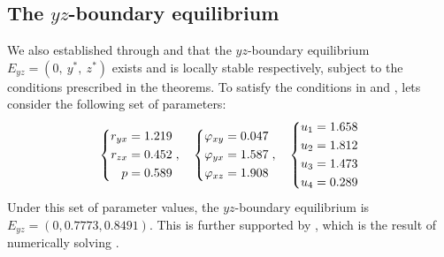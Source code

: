 \subsection{The $yz$-boundary equilibrium}\label{subsec:numsim_yz_boundary_equilibrium}
We also established through  and  that the $yz$-boundary equilibrium $E_{yz}=\left(0,\ y^*,\ z^*\right)$ exists and is locally stable respectively, subject to the conditions prescribed in the theorems. To satisfy the conditions in  and , lets consider the following set of parameters:
\begin{equation}\label{params:boundary-yz}
    \begin{dcases}
        \begin{aligned}
            r_{yx} &= 1.219\\
            r_{zx} &= 0.452\\
            p &= 0.589
        \end{aligned}
    \end{dcases},\quad 
    \begin{dcases}
        \begin{aligned}
            \varphi_{xy} &= 0.047\\
            \varphi_{yx} &= 1.587\\
            \varphi_{xz} &= 1.908
        \end{aligned}
    \end{dcases},\quad
    \begin{dcases}
        \begin{aligned}
            u_1 &= 1.658\\
            u_2 &= 1.812\\
            u_3 &= 1.473\\
            u_4 &= 0.289
        \end{aligned}
    \end{dcases}
\end{equation}
Under this set of parameter values, the $yz$-boundary equilibrium is $E_{yz}=(0,0.7773,0.8491)$. This is further supported by , which is the result of numerically solving .

